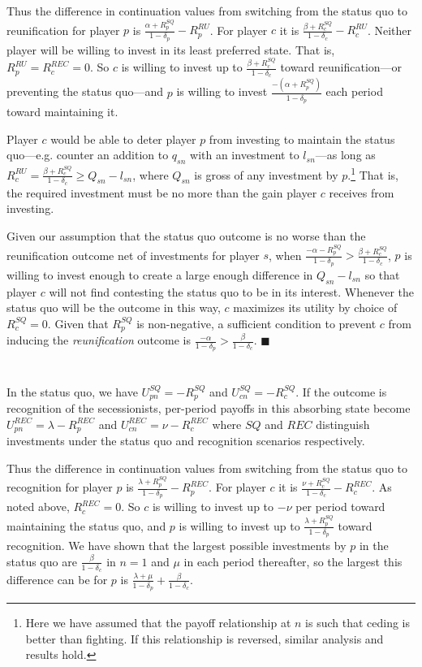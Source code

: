 \documentclass[12pt]{article}
\newcommand{\de}{\delta}
\begin{document}
Thus the difference in continuation values from switching from the status quo to reunification for player $p$ is $\frac{\alpha + R_p^{SQ} 
}{1 -\de_p}-R_p^{RU}$. For player $c$ it is $\frac{\beta + R_c^{SQ}}{1 -\de_c} -R_c^{RU}$. Neither player will be willing to invest in its least preferred state. That is, $R_p^{RU} = R_c^{REC} =0$. So $c$ is willing to invest up to $\frac{\beta+ R_c^{SQ}}{1 -\de_c}$ toward reunification---or preventing the status quo---and $p$ is willing to invest $\frac{-\left(\alpha + R_p^{SQ} 
\right)}{1 -\de_p}$ each period toward maintaining it.

Player $c$ would be able to deter player $p$ from investing to maintain the status quo---e.g. counter an addition to $q_{sn}$ with an investment to $l_{sn}$---as long as $R_c^{RU} = \frac{\beta + R_c^{SQ}}{1 -\de_c} \geq Q_{sn} - l_{sn}$, where $Q_{sn}$ is gross of any investment by $p$.\footnote{Here we have assumed that the payoff relationship at $n$ is such that ceding is better than fighting. If this relationship is reversed, similar analysis and results hold.} That is, the required investment must be no more than the gain player $c$ receives from investing.

Given our assumption that the status quo outcome is no worse than the reunification outcome net of investments for player $s$, when $\frac{-\alpha - R_p^{SQ}}{1 -\de_p} > \frac{\beta+ R_c^{SQ}}{1 -\de_c}$, $p$ is willing to invest enough to create a large enough difference in $Q_{sn} - l_{sn}$ so that player $c$ will not find contesting the status quo to be in its interest. Whenever the status quo will be the outcome in this way, $c$ maximizes its utility by choice of $R_c^{SQ} =0$. Given that $R_p^{SQ}$ is non-negative, a sufficient condition to prevent $c$ from inducing the \emph{reunification} outcome is $\frac{-\alpha}{1 -\de_p}  > \frac{\beta}{1 -\de_c}$. \hfill $\blacksquare$
\\
\\
 \\
In the status quo, we have $U_{pn}^{SQ}= -R_p^{SQ}$ and $U_{cn}^{SQ}= -R_c^{SQ}$. If the outcome is recognition of the secessionists, per-period payoffs in this absorbing state become $U_{pn}^{REC}= \lambda -R_p^{REC}$ and $U_{cn}^{REC}= \nu -R_c^{REC}$ where $SQ$ and $REC$ distinguish investments under the status quo and recognition scenarios respectively.

Thus the difference in continuation values from switching from the status quo to recognition for player $p$ is $\frac{\lambda +R_p^{SQ}}{1 -\de_p} -R_p^{REC}$. For player $c$ it is $\frac{\nu + R_c^{SQ}}{1 -\de_c}-R_c^{REC}$. As noted above, $R_c^{REC} =0$. So $c$ is willing to invest up to $-\nu$ per period toward maintaining the status quo, and $p$ is willing to invest up to $\frac{\lambda +R_p^{SQ}}{1 -\de_p}$ toward recognition. We have shown that the largest possible investments by $p$ in the status quo are $\frac{\beta}{1 -\de_c}$ in $n=1$ and $\mu$ in each period thereafter, so the largest this difference can be for $p$ is $\frac{\lambda + \mu}{1 -\de_p} + \frac{\beta}{1 -\de_c}$.
\end{document}

